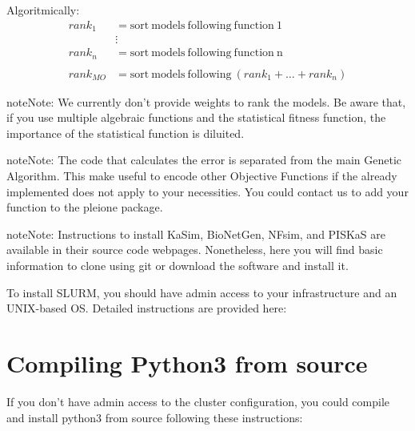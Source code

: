 \documentclass[letterpaper,10pt,english]{sphinxmanual}
\begin{document}
Algoritmically:
\begin{equation*}
\begin{split}rank_1 &= \mathrm{sort\ models\ following\ function\ 1} \\
&\mathrel{\vdots} \\
rank_n &= \mathrm{sort\ models\ following\ function\ n} \\
\\
rank_{MO} &= \mathrm{sort\ models\ following\ } (rank_1 + \ldots + rank_n)\end{split}
\end{equation*}
\begin{sphinxadmonition}{note}{Note:}
We currently don’t provide weights to rank the models. Be aware that, if you
use multiple algebraic functions and the statistical fitness function, the
importance of the statistical function is diluited.
\end{sphinxadmonition}

\begin{sphinxadmonition}{note}{Note:}
The code that calculates the error is separated from the main Genetic
Algorithm. This make useful to encode other Objective Functions if the
already implemented does not apply to your necessities. You could contact us
to add your function to the pleione package.
\end{sphinxadmonition}

\begin{sphinxadmonition}{note}{Note:}
Instructions to install KaSim, BioNetGen, NFsim, and PISKaS are
available in their source code webpages. Nonetheless, here you will find
basic information to clone using git or download the software and install
it.

To install SLURM, you should have admin access to your infrastructure and an
UNIX-based OS. Detailed instructions are provided here:
{\hyperref[\detokenize{SLURM:slurm-instructions}]{}}
\end{sphinxadmonition}


\chapter{Compiling Python3 from source}
\label{\detokenize{Python3:compiling-python3-from-source}}\label{\detokenize{Python3::doc}}
If you don’t have admin access to the cluster configuration, you could compile
and install python3 from source following these instructions:
\end{document}
